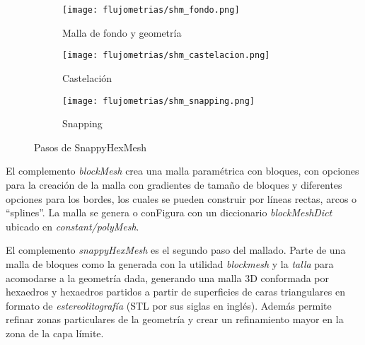 \begin{figure}[t!]
    \centering
    \begin{subfigure}[t]{0.5\textwidth}
        \centering
        \texttt{[image: flujometrias/shm\_fondo.png]}
        \caption{Malla de fondo y geometría}
    \end{subfigure}%
    \begin{subfigure}[t]{0.5\textwidth}
        \centering
        \texttt{[image: flujometrias/shm\_castelacion.png]}
        \caption{Castelación}
    \end{subfigure}
    \begin{subfigure}[t]{0.5\textwidth}
        \centering
        \texttt{[image: flujometrias/shm\_snapping.png]}
        \caption{Snapping}
    \end{subfigure}
    \caption{Pasos de SnappyHexMesh\parencite{shm_steps}}\label{fig:openfoam_shm_pasos}
\end{figure}


El complemento \emph{blockMesh} crea una malla paramétrica con bloques, con
opciones para la creación de la malla con gradientes de tamaño de bloques y
diferentes opciones para los bordes, los cuales se pueden construir por líneas
rectas, arcos o ``splines''.
%
La malla se genera o conFigura con un diccionario \emph{blockMeshDict} ubicado
en \emph{constant/polyMesh}.

El complemento \emph{snappyHexMesh} es el segundo paso del mallado.
%
Parte de una malla de bloques como la generada con la utilidad \emph{blockmesh}
y la \emph{talla} para acomodarse a la geometría dada, generando una malla 3D
conformada por hexaedros y hexaedros partidos a partir de superficies de caras
triangulares en formato de \emph{estereolitografía} (STL por sus siglas en
inglés).
%
Además permite refinar zonas particulares de la geometría y crear un
refinamiento mayor en la zona de la capa límite.





